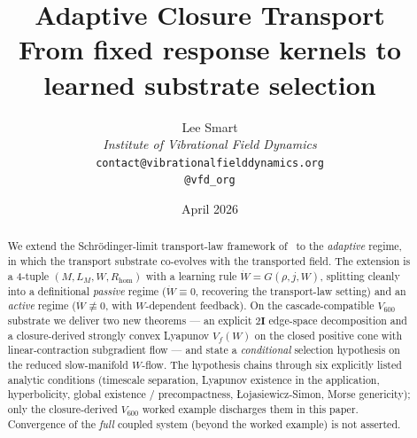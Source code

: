 \documentclass[11pt]{article}
\title{Adaptive Closure Transport\\[6pt]
\large From fixed response kernels to learned substrate selection}
\author{%
  Lee Smart\\[4pt]
  \textit{Institute of Vibrational Field Dynamics}\\[2pt]
  \texttt{contact@vibrationalfielddynamics.org}\\[2pt]
  \texttt{@vfd\_org}%
}
\date{April 2026}
\theoremstyle{definition}
\newcommand{\twoI}{2\mathbf{I}}
\begin{document}
\maketitle

\begin{abstract}
We extend the Schr\"{o}dinger-limit transport-law framework of~\citep{SmartTransportLaw} to the \emph{adaptive} regime, in which the transport substrate co-evolves with the transported field. The extension is a 4-tuple $(M, L_M, W, R_{\mathrm{hom}})$ with a learning rule $\dot W = G(\rho, j, W)$, splitting cleanly into a definitional \emph{passive} regime ($\dot W \equiv 0$, recovering the transport-law setting) and an \emph{active} regime ($\dot W \not\equiv 0$, with $W$-dependent feedback). On the cascade-compatible $V_{600}$ substrate we deliver two new theorems --- an explicit $\twoI$ edge-space decomposition and a closure-derived strongly convex Lyapunov $V_f(W)$ on the closed positive cone with linear-contraction subgradient flow --- and state a \emph{conditional} selection hypothesis on the reduced slow-manifold $W$-flow. The hypothesis chains through six explicitly listed analytic conditions (timescale separation, Lyapunov existence in the application, hyperbolicity, global existence / precompactness, {\L}ojasiewicz-Simon, Morse genericity); only the closure-derived $V_{600}$ worked example discharges them in this paper. Convergence of the \emph{full} coupled system (beyond the worked example) is not asserted.
\end{abstract}

\medskip
\noindent{}
\end{document}
